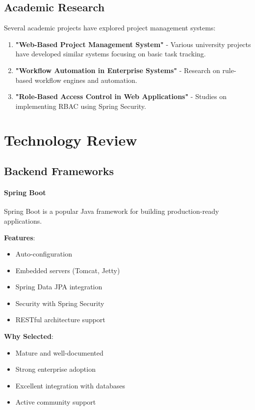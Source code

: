 \documentclass[12pt,a4paper,twoside]{book}
\newcommand{\subsubsubsection}[1]{\paragraph{#1}}
\begin{document}
\subsection{Academic Research}

Several academic projects have explored project management systems:

\begin{enumerate}
    \item \textbf{"Web-Based Project Management System"} - Various university projects have developed similar systems focusing on basic task tracking.

    \item \textbf{"Workflow Automation in Enterprise Systems"} - Research on rule-based workflow engines and automation.

    \item \textbf{"Role-Based Access Control in Web Applications"} - Studies on implementing RBAC using Spring Security.
\end{enumerate}

\section{Technology Review}

\subsection{Backend Frameworks}

\subsubsubsection{Spring Boot}
Spring Boot is a popular Java framework for building production-ready applications.

\textbf{Features}:
\begin{itemize}
    \item Auto-configuration
    \item Embedded servers (Tomcat, Jetty)
    \item Spring Data JPA integration
    \item Security with Spring Security
    \item RESTful architecture support
\end{itemize}

\textbf{Why Selected}:
\begin{itemize}
    \item Mature and well-documented
    \item Strong enterprise adoption
    \item Excellent integration with databases
    \item Active community support
\end{itemize}
\end{document}

